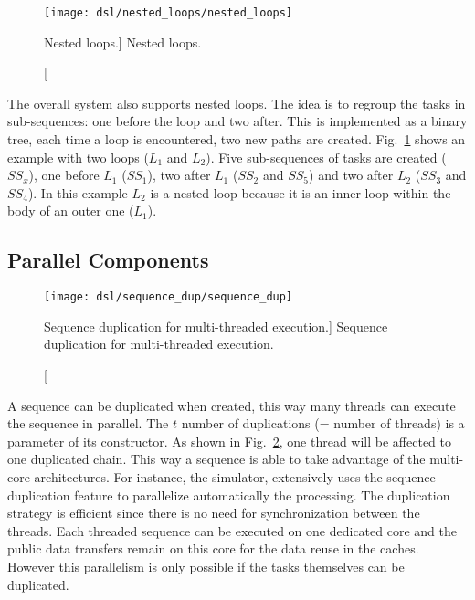 \begin{figure}[htp]
  \centering
  \texttt{[image: dsl/nested\_loops/nested\_loops]}
  \caption
    [Nested loops.]
    {Nested loops.}
  \label{fig:dsl_nested_loops}
\end{figure}

The overall system also supports nested loops. The idea is to regroup the tasks
in sub-sequences: one before the loop and two after. This is implemented as a
binary tree, each time a loop is encountered, two new paths are created.
Fig.~\ref{fig:dsl_nested_loops} shows an example with two loops ($L_1$ and
$L_2$). Five sub-sequences of tasks are created ($SS_x$), one before $L_1$
($SS_1$), two after $L_1$ ($SS_2$ and $SS_5$) and two after $L_2$ ($SS_3$ and
$SS_4$). In this example $L_2$ is a nested loop because it is an inner loop
within the body of an outer one ($L_1$).

\subsection{Parallel Components}

\begin{figure}[htp]
  \centering
  \texttt{[image: dsl/sequence\_dup/sequence\_dup]}
  \caption
    [Sequence duplication for multi-threaded execution.]
    {Sequence duplication for multi-threaded execution.}
  \label{fig:dsl_sequence_dup}
\end{figure}

A sequence can be duplicated when created, this way many threads can execute the
sequence in parallel. The $t$ number of duplications (= number of threads) is a
parameter of its constructor. As shown in Fig.~\ref{fig:dsl_sequence_dup}, one
thread will be affected to one duplicated chain. This way a sequence is able to
take advantage of the multi-core architectures. For instance, the \AFFECT
simulator, extensively uses the sequence duplication feature to parallelize
automatically the processing. The duplication strategy is efficient since there
is no need for synchronization between the threads. Each threaded sequence can
be executed on one dedicated core and the public data transfers remain on this
core for the data reuse in the caches. However this parallelism is only possible
if the tasks themselves can be duplicated.

